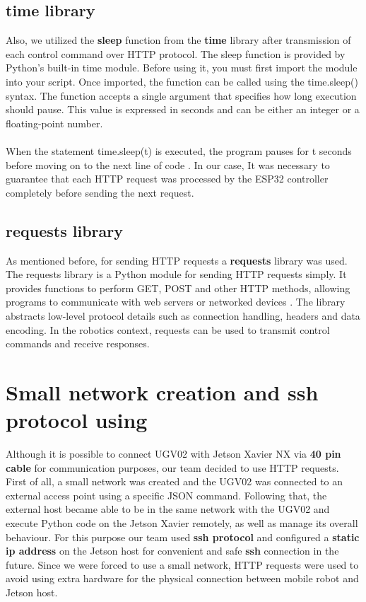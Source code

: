\documentclass[]{IEEEphot}
\begin{document}
\subsection{time library}

Also, we utilized the \textbf{sleep} function from the \textbf{time} library after transmission of each control command over HTTP protocol.
The sleep function is provided by Python’s built-in time module. Before using it, you must first import the module into your script. Once imported, the function can be called using the time.sleep() syntax. The function accepts a single argument that specifies how long execution should pause. This value is expressed in seconds and can be either an integer or a floating-point number. 
\\\\
When the statement time.sleep(t) is executed, the program pauses for t seconds before moving on to the next line of code \cite{python_sleep}. 
In our case, It was necessary to guarantee that each HTTP request was processed by the ESP32 controller completely before sending the next request.

\subsection{requests library}

As mentioned before, for sending HTTP requests a \textbf{requests} library was used. The requests library is a Python module for sending HTTP requests simply. It provides functions to perform GET, POST and other HTTP methods, allowing programs to communicate with web servers or networked devices \cite{python_requests}. The library abstracts low-level protocol details such as connection handling, headers and data encoding. In the robotics context, requests can be used to transmit control commands and receive responses.

\section{Small network creation and ssh protocol using}

Although it is possible to connect UGV02 with Jetson Xavier NX via \textbf{40 pin cable} for communication purposes, our team decided to use HTTP requests. First of all, a small network was created and the UGV02 was connected to an external access point using a specific JSON command. Following that, the external host became able to be in the same network with the UGV02 and execute Python code on the Jetson Xavier remotely, as well as manage its overall behaviour. For this purpose our team used \textbf{ssh protocol} and configured a \textbf{static ip address} on the Jetson host for convenient and safe \textbf{ssh} connection in the future. Since we were forced to use a small network, HTTP requests were used to avoid using extra hardware for the physical connection between mobile robot and Jetson host.
\end{document}
